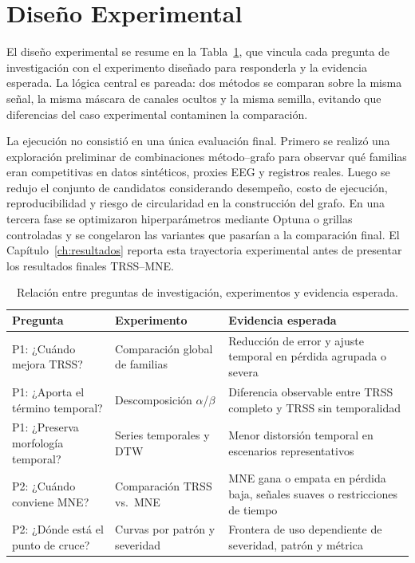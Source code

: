 \section{Diseño Experimental}

El diseño experimental se resume en la Tabla~\ref{tab:research_questions_experiments}, que vincula cada pregunta de investigación con el experimento diseñado para responderla y la evidencia esperada. La lógica central es pareada: dos métodos se comparan sobre la misma señal, la misma máscara de canales ocultos y la misma semilla, evitando que diferencias del caso experimental contaminen la comparación.

La ejecución no consistió en una única evaluación final. Primero se realizó una exploración preliminar de combinaciones método--grafo para observar qué familias eran competitivas en datos sintéticos, proxies EEG y registros reales. Luego se redujo el conjunto de candidatos considerando desempeño, costo de ejecución, reproducibilidad y riesgo de circularidad en la construcción del grafo. En una tercera fase se optimizaron hiperparámetros mediante Optuna o grillas controladas y se congelaron las variantes que pasarían a la comparación final. El Capítulo~\ref{ch:resultados} reporta esta trayectoria experimental antes de presentar los resultados finales TRSS--MNE.
\begin{table}[htbp]
\centering
\caption{Relación entre preguntas de investigación, experimentos y evidencia esperada.}
\label{tab:research_questions_experiments}
\small
\begin{tabular}{@{}p{3.2cm} p{3.0cm} p{5.5cm}@{}}
\toprule
Pregunta & Experimento & Evidencia esperada \\
\midrule
P1: ¿Cuándo mejora TRSS? & Comparación global de familias & Reducción de error y ajuste temporal en pérdida agrupada o severa \\
P1: ¿Aporta el término temporal? & Descomposición $\alpha$/$\beta$ & Diferencia observable entre TRSS completo y TRSS sin temporalidad \\
P1: ¿Preserva morfología temporal? & Series temporales y DTW & Menor distorsión temporal en escenarios representativos \\
P2: ¿Cuándo conviene MNE? & Comparación TRSS vs.\ MNE & MNE gana o empata en pérdida baja, señales suaves o restricciones de tiempo \\
P2: ¿Dónde está el punto de cruce? & Curvas por patrón y severidad & Frontera de uso dependiente de severidad, patrón y métrica \\
\bottomrule
\end{tabular}
\end{table}

